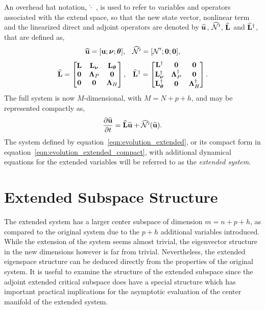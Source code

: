 An overhead hat notation, $\widehat{\cdot}$ , is used to refer to variables and operators associated with the extend space, so that the new state vector, nonlinear term and the linearized direct and adjoint operators are denoted by ${\widehat{\boldsymbol{u}}}$, $\widehat{\mathcal{N}'}$, $\mathbf{\widehat{L}}$ and $\mathbf{\widehat{L}}^{\dagger}$, that are defined as,
\begin{align}
	\evecu = [\vecu; \vecnu; \vectheta], &&	%
	\ENonLin =[\NewNonLin; \veczero; \veczero], \nonumber
\end{align}
%
\begin{align}
	\label{eqn:linearized_operator_extended}
	\mathbf{\widehat{L}} =
	\begin{bmatrix}
		\mathbf{L} & \mathbf{L}_{\boldsymbol{\nu}} & \mathbf{L}_{\boldsymbol{\theta}} \\
		\mathbf{0} 	& \mathbf{\Lambda}_{P} & \mathbf{0} \\
		\mathbf{0} 	& \mathbf{0} &  \mathbf{\Lambda}_{H}
	\end{bmatrix},	
	&&
	\mathbf{\widehat{L}}^{\dagger} =
	\begin{bmatrix}
		\mathbf{L}^{\dagger} 		   & \mathbf{0} & \mathbf{0} \\
		\mathbf{L}_{\boldsymbol{\nu}}^{\dagger}	 	& \mathbf{\Lambda}^{\dagger}_{P} & \mathbf{0} \\
		\mathbf{L}_{\boldsymbol{\theta}}^{\dagger}  & \mathbf{0} & \mathbf{\Lambda}^{\dagger}_{H} \\
	\end{bmatrix}.
\end{align}
The full system is now $M$-dimensional, with $M=N+p+h$, and may be represented compactly as,
\begin{equation}
	\label{eqn:evolution_extended_compact}
	\dfrac{\partial \widehat{\mathbf{u}}}{\partial t} =
	\mathbf{\widehat{L}}\widehat{\mathbf{u}}  + \widehat{\mathcal{N}'}(\widehat{\mathbf{u}}).
\end{equation}
The system defined by equation~\eqref{eqn:evolution_extended}, or its compact form in equation~\eqref{eqn:evolution_extended_compact}, with additional dynamical equations for the extended variables will be referred to as the \emph{extended system}. 

\section{Extended Subspace Structure}
\label{sec:extended_subspace_structure}

The extended system has a larger center subspace of dimension $m = n+p+h$, as compared to the original system due to the $p+h$ additional variables introduced. While the extension of the system seems almost trivial, the eigenvector structure in the new dimensions however is far from trivial. Nevertheless, the extended eigenspace structure can be deduced directly from the properties of the original system. It is useful to examine the structure of the extended subspace since the adjoint extended critical subspace does have a special structure which has important practical implications for the asymptotic evaluation of the center manifold of the extended system.

